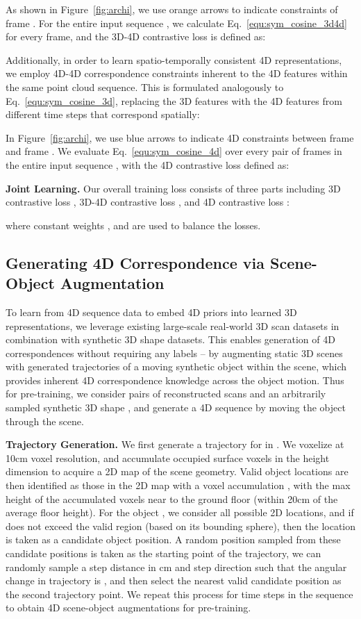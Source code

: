 \documentclass[runningheads]{llncs}
\begin{document}
As shown in Figure~\ref{fig:archi}, we use \textcolor{orange_fig}{orange} arrows to indicate constraints of frame .
For the entire input sequence , we calculate Eq.~\ref{equ:sym_cosine_3d4d} for every frame, and the 3D-4D contrastive loss  is defined as:


Additionally, in order to learn spatio-temporally consistent 4D representations, we employ 4D-4D correspondence constraints inherent to the 4D features within the same point cloud sequence. 
This is formulated analogously to Eq.~\ref{equ:sym_cosine_3d}, replacing the 3D features with the 4D features from different time steps that correspond spatially:

In Figure~\ref{fig:archi}, we use \textcolor{blue_fig}{blue} arrows to indicate 4D constraints between frame  and frame .
We evaluate Eq.~\ref{equ:sym_cosine_4d} over every pair of frames in the entire input sequence , with the 4D contrastive loss   defined as:


\noindent\textbf{Joint Learning.} Our overall training loss  consists of three parts including 3D contrastive loss , 3D-4D contrastive loss , and 4D
contrastive loss :

where constant weights ,  and
 are used to balance the losses.

\subsection{Generating 4D Correspondence via Scene-Object Augmentation}
\label{subsec:data_generation}
To learn from 4D sequence data to embed 4D priors into learned 3D representations, we leverage existing large-scale real-world 3D scan datasets in combination with synthetic 3D shape datasets.
This enables generation of 4D correspondences without requiring any labels -- by augmenting static 3D scenes with generated trajectories of a moving synthetic object within the scene, which provides inherent 4D correspondence knowledge across the object motion.
Thus for pre-training, we consider pairs of reconstructed scans and an arbitrarily sampled synthetic 3D shape , and generate a 4D sequence  by moving the object through the scene.

\noindent\textbf{Trajectory Generation.} 
We first generate a trajectory for  in .
We voxelize  at 10cm voxel resolution, and accumulate occupied surface voxels in the height dimension to acquire a 2D map of the scene geometry.
Valid object locations are then identified as those in the 2D map with a voxel accumulation , with the max height of the accumulated voxels near to the ground floor (within 20cm of the average floor height).
For the object , we consider all possible 2D locations, and if  does not exceed the valid region (based on its bounding sphere), then the location is taken as a candidate object position.
A random position sampled from these candidate positions is taken as the starting point of the trajectory, we can randomly sample a step distance in cm and step direction such that the angular change in trajectory is , and then select the nearest valid candidate position as the second trajectory point. 
We repeat this process for  time steps in the sequence to obtain 4D scene-object augmentations for pre-training.
\end{document}
